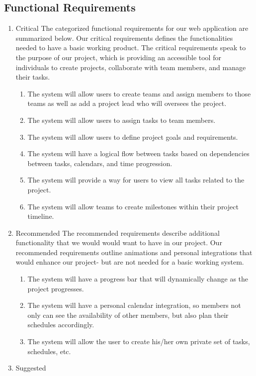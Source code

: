 \subsection{Functional Requirements}
\begin{enumerate}
\item Critical
The categorized functional requirements for our web application are summarized below. Our critical requirements defines the functionalities needed to have a basic working product. The critical requirements speak to the purpose of our project, which is providing an accessible tool for individuals to create projects, collaborate with team members, and manage their tasks.
	\begin{enumerate}
	\item The system will allow users to create teams and assign members to those teams as well as add a project lead who will oversees the project. 
	\item The system will allow users to assign tasks to team members.
	\item The system will allow users to define project goals and requirements.
	\item The system will have a logical flow between tasks based on dependencies between tasks, calendars, and time progression. 
	\item The system will provide a way for users to view all tasks related to the project.
	\item The system will allow teams to create milestones within their project timeline.
	\end{enumerate}
\item Recommended
The recommended requirements describe additional functionality that we would would want to have in our project. Our recommended requirements outline animations and personal integrations that would enhance our project- but are not needed for a basic working system. 
	\begin{enumerate}
	\item The system will have a progress bar that will dynamically change as the project progresses.
	\item The system will have a personal calendar integration, so members not only can see the availability of other members, but also plan their schedules accordingly.
	\item The system will allow the user to create his/her own private set of tasks, schedules, etc.
	\end{enumerate}
\item Suggested

\end{enumerate}
